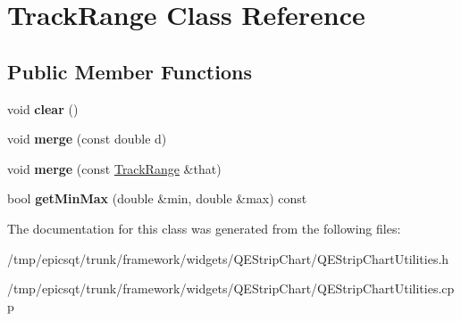 \hypertarget{classTrackRange}{
\section{TrackRange Class Reference}
\label{classTrackRange}
}
\subsection*{Public Member Functions}
\begin{DoxyCompactItemize}
\item 
\hypertarget{classTrackRange_a32a2cfc046132d9a565d3e87cd3819ae}{
void {\bfseries clear} ()}
\label{classTrackRange_a32a2cfc046132d9a565d3e87cd3819ae}

\item 
\hypertarget{classTrackRange_a100fed5cd8db6631e705c3fb8a477a96}{
void {\bfseries merge} (const double d)}
\label{classTrackRange_a100fed5cd8db6631e705c3fb8a477a96}

\item 
\hypertarget{classTrackRange_af61488501ed3913503e3e7203fe99f56}{
void {\bfseries merge} (const \hyperlink{classTrackRange}{TrackRange} \&that)}
\label{classTrackRange_af61488501ed3913503e3e7203fe99f56}

\item 
\hypertarget{classTrackRange_aed472213220a02dd67b64e843e0d0680}{
bool {\bfseries getMinMax} (double \&min, double \&max) const }
\label{classTrackRange_aed472213220a02dd67b64e843e0d0680}

\end{DoxyCompactItemize}


The documentation for this class was generated from the following files:\begin{DoxyCompactItemize}
\item 
/tmp/epicsqt/trunk/framework/widgets/QEStripChart/QEStripChartUtilities.h\item 
/tmp/epicsqt/trunk/framework/widgets/QEStripChart/QEStripChartUtilities.cpp\end{DoxyCompactItemize}
